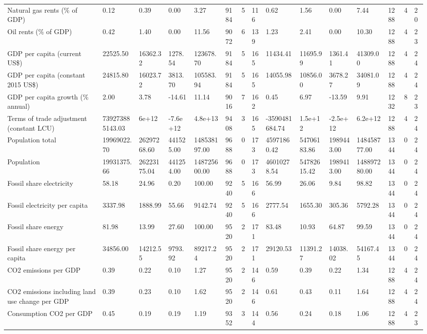\begin{longtable}{lllllllllllllll}
\addlinespace
Natural gas rents (\% of GDP) & 0.12 & 0.39 & 0.00 & 3.27 & 9184 & 5 & 116 & 0.62 & 1.56 & 0.00 & 7.44 & 1288 & 4 & 20\\
Oil rents (\% of GDP) & 0.42 & 1.40 & 0.00 & 11.56 & 9072 & 6 & 139 & 1.23 & 2.41 & 0.00 & 10.30 & 1288 & 4 & 23\\
GDP per capita (current US\$) & 22525.50 & 16362.32 & 1278.54 & 123678.70 & 9184 & 5 & 165 & 11434.41 & 11695.99 & 1361.41 & 41309.00 & 1288 & 4 & 24\\
GDP per capita (constant 2015 US\$) & 24815.80 & 16023.72 & 3813.70 & 105583.94 & 9184 & 5 & 165 & 14055.98 & 10856.00 & 3678.27 & 34081.09 & 1288 & 4 & 24\\
GDP per capita growth (\% annual) & 2.00 & 3.78 & -14.61 & 11.14 & 9016 & 7 & 162 & 0.45 & 6.97 & -13.59 & 9.91 & 1232 & 8 & 23\\
\addlinespace
Terms of trade adjustment (constant LCU) & 739273885143.03 & 6e+12 & -7.6e+12 & 4.8e+13 & 9408 & 3 & 165 & -3590481684.74 & 1.5e+12 & -2.5e+12 & 6.2e+12 & 1288 & 4 & 24\\
Population total & 19969022.70 & 26297268.60 & 441525.00 & 148538197.00 & 9688 & 0 & 173 & 45971860.42 & 54706183.86 & 1989443.00 & 148458777.00 & 1344 & 0 & 24\\
Population & 19931375.66 & 26223175.04 & 441254.00 & 148725600.00 & 9688 & 0 & 173 & 46010278.54 & 54782615.42 & 1989413.00 & 148897280.00 & 1344 & 0 & 24\\
Fossil share electricity & 58.18 & 24.96 & 0.20 & 100.00 & 9240 & 5 & 166 & 56.99 & 26.06 & 9.84 & 98.82 & 1344 & 0 & 24\\
Fossil electricity per capita & 3337.98 & 1888.99 & 55.66 & 9142.74 & 9240 & 5 & 166 & 2777.54 & 1655.30 & 305.36 & 5792.28 & 1344 & 0 & 24\\
\addlinespace
Fossil share energy & 81.98 & 13.99 & 27.60 & 100.00 & 9520 & 2 & 171 & 83.48 & 10.93 & 64.87 & 99.59 & 1344 & 0 & 24\\
Fossil share energy per capita & 34856.00 & 14212.55 & 9793.92 & 89217.24 & 9520 & 2 & 171 & 29120.53 & 11391.27 & 14038.02 & 54167.45 & 1344 & 0 & 24\\
CO2 emissions per GDP & 0.39 & 0.22 & 0.10 & 1.27 & 9520 & 2 & 146 & 0.59 & 0.39 & 0.22 & 1.34 & 1288 & 4 & 24\\
CO2 emissions including land use change per GDP & 0.39 & 0.23 & 0.10 & 1.62 & 9520 & 2 & 146 & 0.61 & 0.43 & 0.11 & 1.64 & 1288 & 4 & 24\\
Consumption CO2 per GDP & 0.45 & 0.19 & 0.19 & 1.19 & 9352 & 3 & 144 & 0.56 & 0.24 & 0.18 & 1.06 & 1288 & 4 & 23\\

\end{longtable}
